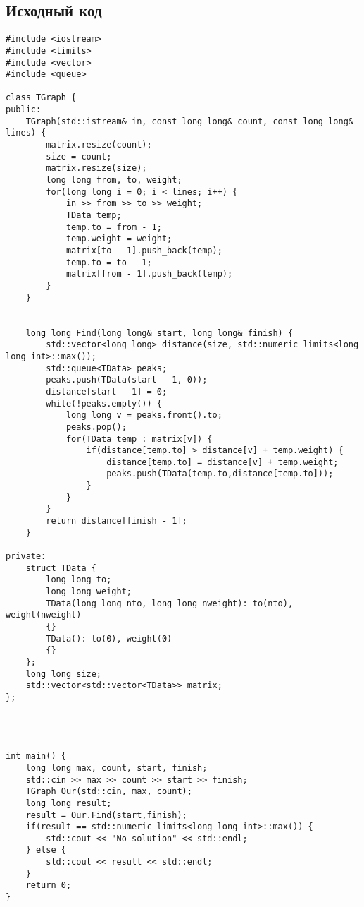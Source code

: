 \documentclass[12pt]{article}
\begin{document}
\subsection*{Исходный код}
\begin{verbatim}
#include <iostream>
#include <limits>
#include <vector>
#include <queue>

class TGraph {
public:
    TGraph(std::istream& in, const long long& count, const long long& lines) {
        matrix.resize(count);
        size = count;
        matrix.resize(size);
        long long from, to, weight;
        for(long long i = 0; i < lines; i++) {
            in >> from >> to >> weight;
            TData temp;
            temp.to = from - 1;
            temp.weight = weight;
            matrix[to - 1].push_back(temp);
            temp.to = to - 1;
            matrix[from - 1].push_back(temp);
        }
    }


    long long Find(long long& start, long long& finish) {
        std::vector<long long> distance(size, std::numeric_limits<long long int>::max());
        std::queue<TData> peaks;
        peaks.push(TData(start - 1, 0)); 
        distance[start - 1] = 0;
        while(!peaks.empty()) {
            long long v = peaks.front().to;
            peaks.pop();
            for(TData temp : matrix[v]) {
                if(distance[temp.to] > distance[v] + temp.weight) {
                    distance[temp.to] = distance[v] + temp.weight;
                    peaks.push(TData(temp.to,distance[temp.to]));
                }
            }
        }
        return distance[finish - 1];
    }

private:
    struct TData {
        long long to;
        long long weight;
        TData(long long nto, long long nweight): to(nto), weight(nweight)
        {}
        TData(): to(0), weight(0)
        {}
    };
    long long size;
    std::vector<std::vector<TData>> matrix;
};




int main() {
    long long max, count, start, finish;
    std::cin >> max >> count >> start >> finish;
    TGraph Our(std::cin, max, count);
    long long result;
    result = Our.Find(start,finish);
    if(result == std::numeric_limits<long long int>::max()) {
        std::cout << "No solution" << std::endl;
    } else {
        std::cout << result << std::endl;
    }
    return 0;
}
\end{verbatim}\newline
\end{document}
